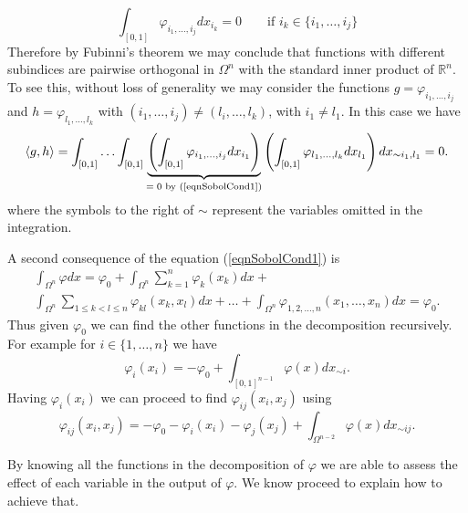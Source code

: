 \documentclass[12pt]{book}
\begin{document}
\begin{equation}\label{eqnSobolCond1}
\int_{[0,1]}\varphi_{i_{1},\ldots,i_{j}}dx_{i_{k}}=0\qquad\text{if }  i_{k}\in \{i_{1},\ldots,i_{j}\}
\end{equation} 
Therefore by Fubinni's theorem \cite{lerner2014course} we may conclude that functions with different subindices are 
 pairwise orthogonal in $\Omega^{n}$ with the standard inner product of $\mathbb{R}^{n}$\cite{bressan1900lecture}. 
To see this, without loss of generality
we may  consider the functions $g=\varphi_{i_{1},\ldots,i_{j}}$ and $h=\varphi_{l_{1},\ldots,l_{k}}$ 
with $(i_{1},\ldots,i_{j})\neq(l_{i},\ldots,l_{k})$, with $i_{1}\neq l_{1}$. In this case we have
\begin{equation*}
\langle g,h\rangle=\int_{[0,1]}\ldots\int_{[0,1]}\underbrace{\left(\int_{[0,1]}\varphi_{i_{1},
\ldots,i_{j}}dx_{i_{1}}\right)}_{\text{$=0$ by (\ref{eqnSobolCond1})}}
\left(\int_{[0,1]}\varphi_{l_{1},\ldots,l_{k}}dx_{l_{1}}\right)dx_{\sim i_{1},l_{1}}=0.
\end{equation*}
where the symbols to the right of $\sim$ represent the variables omitted in the integration.

A second consequence of the equation (\ref{eqnSobolCond1}) is 
\begin{eqnarray*}
\int_{\Omega^{n}}\varphi dx=\varphi_{0}+\int_{\Omega^{n}}\sum_{k=1}^{n}\varphi_{k}(x_{k})dx+\\
\int_{\Omega^{n}}\sum_{1\leq k< l\leq n}\varphi_{kl}(x_{k},x_{l})dx+\ldots+
\int_{\Omega^{n}}\varphi_{1,2,\ldots,n}(x_{1},\ldots,x_{n})dx=\varphi_{0}.
\end{eqnarray*}
Thus given $\varphi_{0}$ we can find the other functions in the decomposition recursively. For example 
for $i\in \{1,\ldots,n\}$ we have
\begin{equation*}
\varphi_{i}(x_{i})=-\varphi_{0}+\int_{[0,1]^{n-1}}\varphi(x)dx_{\sim i}.
\end{equation*}
Having $\varphi_{i}(x_{i})$ we can proceed to find $\varphi_{ij}(x_{i},x_{j})$ using
\begin{equation*}
\varphi_{ij}(x_{i},x_{j})=-\varphi_{0}-\varphi_{i}(x_{i})-\varphi_{j}(x_{j})+
\int_{\Omega^{n-2}}\varphi(x)dx_{\sim ij}.
\end{equation*}

By knowing all
the functions in the decomposition of $\varphi$ we are able  to assess the effect of each variable 
in the output of $\varphi$. We know proceed to explain how to achieve that.
 
\end{document}
